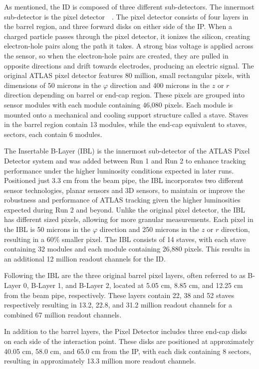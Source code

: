 As mentioned, the ID is composed of three different sub-detectors. The innermost sub-detector is the pixel detector~\cite{pixel_detector_2008}~\cite{pixel_detector_ibl}. The pixel detector consists of four layers in the barrel region, and three forward disks on either side of the IP\@. When a charged particle passes through the pixel detector, it ionizes the silicon, creating electron-hole pairs along the path it takes. A strong bias voltage is applied across the sensor, so when the electron-hole pairs are created, they are pulled in opposite directions and drift towards electrodes, producing an electric signal. 
The original ATLAS pixel detector features 80 million, small rectangular pixels, with dimensions of 50 microns in the $\varphi$ direction and 400 microns in the $z$ or $r$ direction depending on barrel or end-cap region. These pixels are grouped into sensor modules with each module containing 46,080 pixels. Each module is mounted onto a mechanical and cooling support structure called a stave. Staves in the barrel region contain 13 modules, while the end-cap equivalent to staves, sectors, each contain 6 modules.

The Insertable B-Layer (IBL) is the innermost sub-detector of the ATLAS Pixel Detector system and was added between Run 1 and Run 2 to enhance tracking performance under the higher luminosity conditions expected in later runs. Positioned just 3.3 cm from the beam pipe, the IBL incorporates two different sensor technologies, planar sensors and 3D sensors, to maintain or improve the robustness and performance of ATLAS tracking given the higher luminosities expected during Run 2 and beyond. Unlike the original pixel detector, the IBL has different sized pixels, allowing for more granular measurements. Each pixel in the IBL is 50 microns in the $\varphi$ direction and 250 microns in the $z$ or $r$ direction, resulting in a 60\% smaller pixel. The IBL consists of 14 staves, with each stave containing 32 modules and each module containing 26,880 pixels. This results in an additional 12 million readout channels for the ID\@.

Following the IBL are the three original barrel pixel layers, often referred to as B-Layer 0, B-Layer 1, and B-Layer 2, located at 5.05 cm, 8.85 cm, and 12.25 cm from the beam pipe, respectively. These layers contain 22, 38 and 52 staves respectively resulting in 13.2, 22.8, and 31.2 million readout channels for a combined 67 million readout channels.

In addition to the barrel layers, the Pixel Detector includes three end-cap disks on each side of the interaction point. These disks are positioned at approximately 40.05 cm, 58.0 cm, and 65.0 cm from the IP, with each disk containing 8 sectors, resulting in approximately 13.3 million more readout channels.